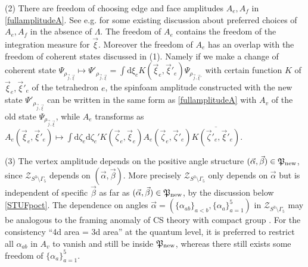 \documentclass[aps,prd,notitlepage,nofootinbib,superscriptaddress,groupedaddress,twocolumn]{revtex4-1}
\newcommand{\cz}{\mathcal Z}
\renewcommand{\a}{\alpha}
\renewcommand{\b}{\beta}
\newcommand{\G}{\Gamma}
\renewcommand{\L }{\Lambda}
\newcommand{\rmd}{\mathrm d}
\begin{document}
(2) There are freedom of choosing edge and face amplitudes $A_e,A_f$ in \eqref{fullamplitudeA}. See e.g. \cite{Kaminski:2009cc,face} for some existing discussion about preferred choices of $A_e,A_f$ in the absence of $\L$. The freedom of $A_e$ contains the freedom of the integration measure for $\vec{\xi}$. Moreover the freedom of $A_e$ has an overlap with the freedom of coherent states discussed in (1). Namely if we make a change of coherent state $\Psi_{\rho_{\vec{j},\vec{\xi}}}\mapsto\Psi'_{\rho_{\vec{j},\vec{\xi}}}=\int \rmd \xi_e K(\vec{\xi}_e,\vec{\xi}'_e)\Psi_{\rho_{\vec{j},\vec{\xi}'}}$ with certain function $K$ of $\vec{\xi}_e,\vec{\xi}'_e$ of the tetrahedron $e$, the spinfoam amplitude constructed with the new state $\Psi'_{\rho_{\vec{j},\vec{\xi}}}$ can be written in the same form as \eqref{fullamplitudeA} with $A_v$ of the old state $\Psi_{\rho_{\vec{j},\vec{\xi}}}$, while $A_e$ transforms as $A_e(\vec{\xi}_e,\vec{\xi}'_e)\mapsto \int \rmd\zeta_{e}\rmd\zeta_{e}'K(\vec{\zeta}_e,\vec{\xi}_e)A_e(\vec{\zeta}_e,\vec{\zeta}'_e)\overline{K(\vec{\zeta}'_e,\vec{\xi}'_e)}$.




(3) The vertex amplitude depends on the positive angle structure $(\vec{\a},\vec{\b})\in \Fp_{\rm new}$, since $\cz_{S^3\setminus\G_5}$ depends on $(\vec{\a},\vec{\b})$. More precisely $\cz_{S^3\setminus\G_5}$ only depends on $\vec{\a}$ but is independent of specific $\vec{\b}$ as far as $(\vec{\a},\vec{\b})\in \Fp_{\rm new}$, by the discussion below \eqref{STUFpoct}. The dependence on angles $\vec{\a}=(\{\a_{ab}\}_{a<b},\{\a_a\}_{a=1}^5)$ in $\cz_{S^3\setminus\G_5}$ may be analogous to the framing anomaly of CS theory with compact group \cite{Witten1991,Witten1989a}. For the consistency ``4d area = 3d area'' at the quantum level, it is preferred to restrict all $\a_{ab}$ in $A_v$ to vanish and still be inside $\mathfrak{P}_{\rm new}$, whereas there still exists some freedom of $\{\a_a\}_{a=1}^5$.
\end{document}
